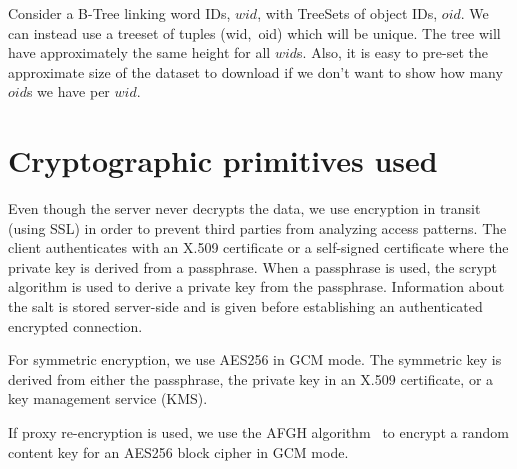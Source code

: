 \documentclass[notitlepage,longbibliography]{revtex4-1}
\begin{document}
Consider a B-Tree linking word IDs, $wid$, with TreeSets of object IDs, $oid$.
We can instead use a treeset of tuples (wid,~oid) which will be unique.
The tree will have approximately the same height for all $wid$s.
Also, it is easy to pre-set the approximate size of the dataset to download if we don't want to show how many $oid$s we have per $wid$.

\section{Cryptographic primitives used}

Even though the server never decrypts the data, we use encryption in transit (using SSL) in order to prevent third parties from analyzing access patterns.
The client authenticates with an X.509 certificate or a self-signed certificate where the private key is derived from a passphrase.
When a passphrase is used, the scrypt algorithm is used to derive a private key from the passphrase. Information about the salt is stored server-side and is given before establishing an authenticated encrypted connection.

For symmetric encryption, we use AES256 in GCM mode.
The symmetric key is derived from either the passphrase, the private key in an X.509 certificate, or a key management service (KMS).

If proxy re-encryption is used, we use the AFGH algorithm~\cite{afgh} to encrypt a random content key for an AES256 block cipher in GCM mode.


\end{document}
